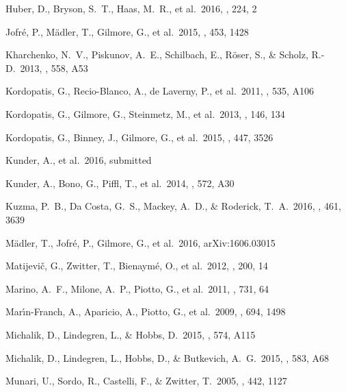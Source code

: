 \documentclass[preprint,trackchanges]{aastex}
\begin{document}
\begin{thebibliography}{dummy}
 Huber, D., Bryson, S.~T., Haas, M.~R., et al.\ 2016, \apjs, 224, 2 

 Jofr{\'e}, P., M{\"a}dler, T., Gilmore, G., et al.\ 2015, \mnras, 453, 1428 

 Kharchenko, N.~V., Piskunov, A.~E., Schilbach, E., R{\"o}ser, S., \& Scholz, R.-D.\ 2013, \aap, 558, A53 

 Kordopatis, G., Recio-Blanco, A., de Laverny, P., et al.\ 2011, \aap, 535, A106 

 Kordopatis, G., Gilmore, G., Steinmetz, M., et al.\ 2013, \aj, 146, 134 

 Kordopatis, G., Binney, J., Gilmore, G., et al.\ 2015, \mnras, 447, 3526 

 Kunder, A., et al.\ 2016, submitted

 Kunder, A., Bono, G., Piffl, T., et al.\ 2014, \aap, 572, A30 

 Kuzma, P.~B., Da Costa, G.~S., Mackey, A.~D., \& Roderick, T.~A.\ 2016, \mnras, 461, 3639 

 M{\"a}dler, T., Jofr{\'e}, P., Gilmore, G., et al.\ 2016, arXiv:1606.03015 

 Matijevi{\v c}, G., Zwitter, T., Bienaym{\'e}, O., et al.\ 2012, \apjs, 200, 14 

 Marino, A.~F., Milone, A.~P., Piotto, G., et al.\ 2011, \apj, 731, 64 

 Mar{\'{\i}}n-Franch, A., Aparicio, A., Piotto, G., et al.\ 2009, \apj, 694, 1498 

 Michalik, D., Lindegren, L., \& Hobbs, D.\ 2015, \aap, 574, A115 

 Michalik, D., Lindegren, L., Hobbs, D., \& Butkevich, A.~G.\ 2015, \aap, 583, A68 

 Munari, U., Sordo, R., Castelli, F., \& Zwitter, T.\ 2005, \aap, 442, 1127 


\end{thebibliography}
\end{document}
